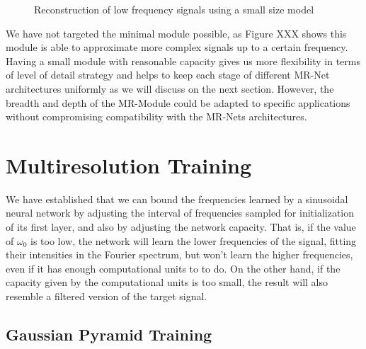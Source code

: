\begin{figure}
\begin{subfigure}[b]{0.3\textwidth}
    \end{subfigure}
    \caption{Reconstruction of low frequency signals using a small size model}
    \label{f:mr-module}
\end{figure}

We have not targeted the minimal module possible, as Figure XXX shows this module is able to approximate more complex signals up to a certain frequency. Having a small module with reasonable capacity gives us more flexibility in terms of level of detail strategy and helps to keep each stage of different MR-Net architectures uniformly as we will discuss on the next section. However, the breadth and depth of the MR-Module could be adapted to specific applications without compromising compatibility with the MR-Nets architectures.



\section{Multiresolution Training}

We have established that we can bound the frequencies learned by a sinusoidal neural network by adjusting the interval of frequencies sampled for initialization of its first layer, and also by adjusting the network capacity. That is, if the value of $\omega_0$ is too low, the network will learn the lower frequencies of the signal, fitting their intensities in the Fourier spectrum, but won't learn the higher frequencies, even if it has enough computational units to to do. On the other hand, if the capacity given by the computational units is too small, the result will also resemble a filtered version of the target signal.

\subsection{Gaussian Pyramid Training}

